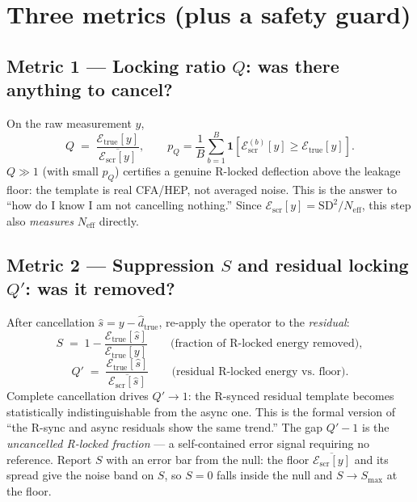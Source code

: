 \documentclass[11pt]{article}
\newcommand{\Elock}{\mathcal{E}}
\newcommand{\true}{\mathrm{true}}
\newcommand{\scr}{\mathrm{scr}}
\newcommand{\Neff}{N_{\mathrm{eff}}}
\newcommand{\shat}{\widehat{s}}
\newcommand{\dhat}{\widehat{d}}
\begin{document}
\section{Three metrics (plus a safety guard)}

\subsection*{Metric 1 --- Locking ratio $Q$: was there anything to cancel?}
On the raw measurement $y$,
\begin{equation}
Q \;=\; \frac{\Elock_\true[y]}{\overline{\Elock_\scr[y]}},
\qquad
p_Q = \frac{1}{B}\sum_{b=1}^{B}\mathbf{1}\!\left[\Elock_{\scr}^{(b)}[y] \geq \Elock_\true[y]\right].
\end{equation}
$Q\gg1$ (with small $p_Q$) certifies a genuine R-locked deflection above the leakage floor: the
template is real CFA/HEP, not averaged noise. This is the answer to ``how do I know I am not
cancelling nothing.'' Since $\Elock_\scr[y]=\mathrm{SD}^2/\Neff$, this step also \emph{measures}
$\Neff$ directly.

\subsection*{Metric 2 --- Suppression $S$ and residual locking $Q'$: was it removed?}
After cancellation $\shat = y - \dhat_\true$, re-apply the operator to the \emph{residual}:
\begin{equation}
S \;=\; 1 - \frac{\Elock_\true[\shat]}{\Elock_\true[y]}
\qquad\text{(fraction of R-locked energy removed)},
\end{equation}
\begin{equation}
Q' \;=\; \frac{\Elock_\true[\shat]}{\overline{\Elock_\scr[\shat]}}
\qquad\text{(residual R-locked energy vs.\ floor)}.
\end{equation}
Complete cancellation drives $Q'\to 1$: the R-synced residual template becomes statistically
indistinguishable from the async one. This is the formal version of ``the R-sync and async
residuals show the same trend.'' The gap $Q'-1$ is the \emph{uncancelled R-locked fraction} --- a
self-contained error signal requiring no reference. Report $S$ with an error bar from the null:
the floor $\overline{\Elock_\scr[y]}$ and its spread give the noise band on $S$, so
$S = 0$ falls inside the null and $S\to S_{\max}$ at the floor.
\end{document}

